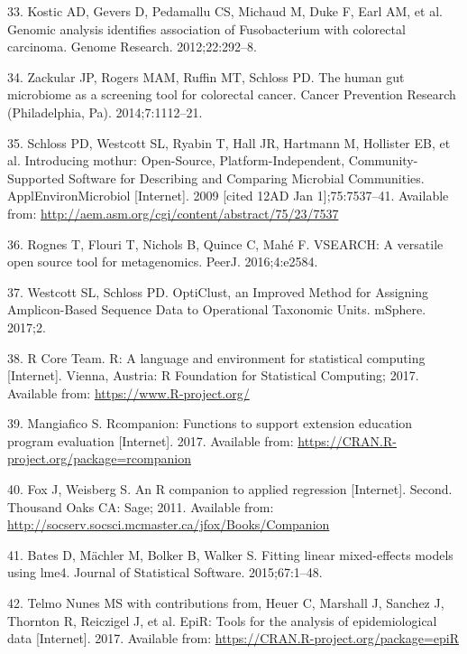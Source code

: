 \documentclass[12pt,]{article}
\begin{document}
\hypertarget{ref-kostic_genomic_2012}{}
33. Kostic AD, Gevers D, Pedamallu CS, Michaud M, Duke F, Earl AM, et
al. Genomic analysis identifies association of Fusobacterium with
colorectal carcinoma. Genome Research. 2012;22:292--8.

\hypertarget{ref-zackular_human_2014}{}
34. Zackular JP, Rogers MAM, Ruffin MT, Schloss PD. The human gut
microbiome as a screening tool for colorectal cancer. Cancer Prevention
Research (Philadelphia, Pa). 2014;7:1112--21.

\hypertarget{ref-schloss_introducing_2009}{}
35. Schloss PD, Westcott SL, Ryabin T, Hall JR, Hartmann M, Hollister
EB, et al. Introducing mothur: Open-Source, Platform-Independent,
Community-Supported Software for Describing and Comparing Microbial
Communities. ApplEnvironMicrobiol {[}Internet{]}. 2009 {[}cited 12AD Jan
1{]};75:7537--41. Available from:
\url{http://aem.asm.org/cgi/content/abstract/75/23/7537}

\hypertarget{ref-rognes_vsearch_2016}{}
36. Rognes T, Flouri T, Nichols B, Quince C, Mahé F. VSEARCH: A
versatile open source tool for metagenomics. PeerJ. 2016;4:e2584.

\hypertarget{ref-westcott_opticlust_2017}{}
37. Westcott SL, Schloss PD. OptiClust, an Improved Method for Assigning
Amplicon-Based Sequence Data to Operational Taxonomic Units. mSphere.
2017;2.

\hypertarget{ref-r_citation_2017}{}
38. R Core Team. R: A language and environment for statistical computing
{[}Internet{]}. Vienna, Austria: R Foundation for Statistical Computing;
2017. Available from: \url{https://www.R-project.org/}

\hypertarget{ref-rcompanion_citation_2017}{}
39. Mangiafico S. Rcompanion: Functions to support extension education
program evaluation {[}Internet{]}. 2017. Available from:
\url{https://CRAN.R-project.org/package=rcompanion}

\hypertarget{ref-car_citation_2011}{}
40. Fox J, Weisberg S. An R companion to applied regression
{[}Internet{]}. Second. Thousand Oaks CA: Sage; 2011. Available from:
\url{http://socserv.socsci.mcmaster.ca/jfox/Books/Companion}

\hypertarget{ref-lme4_citation_2015}{}
41. Bates D, Mächler M, Bolker B, Walker S. Fitting linear mixed-effects
models using lme4. Journal of Statistical Software. 2015;67:1--48.

\hypertarget{ref-epir_citation_2017}{}
42. Telmo Nunes MS with contributions from, Heuer C, Marshall J, Sanchez
J, Thornton R, Reiczigel J, et al. EpiR: Tools for the analysis of
epidemiological data {[}Internet{]}. 2017. Available from:
\url{https://CRAN.R-project.org/package=epiR}
\end{document}

